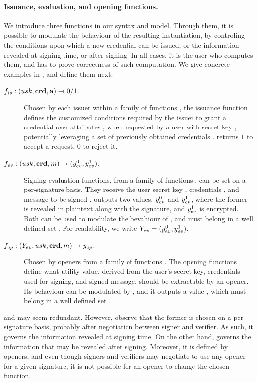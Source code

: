 \paragraph{Issuance, evaluation, and opening functions.} %
We introduce three functions in our syntax and model. Through them,
it is possible to modulate the behaviour of the resulting instantiation, by
controling the conditions upon which a new credential can be issued, or the
information revealed at signing time, or after signing. In all cases, it is
the user who computes them, and has to prove correctness of such computation.
We give concrete examples in , and define them next:

\begin{description}
\item[$f_{is}: (usk,\mathbf{crd},\mathbf{a})
  \rightarrow 0/1$.] Chosen by each issuer within a family of functions
  \famfissue, the issuance function defines the customized conditions required
  by the issuer to grant a credential over attributes \attrs, when requested by
  a user with secret key \usk, potentially leveraging a set of previously
  obtained credentials \scred. \fissue returns $1$ to accept a request, $0$ to
  reject it.
\item[$f_{ev}: (usk,\mathbf{crd},m)
  \rightarrow (y_{ev}^0,y_{ev}^1)$.] Signing evaluation functions, from a
  family of functions \famfeval, can be set on a per-signature basis. They
  receive the user secret key \usk, credentials \scred, and message to be signed
  \msg. \feval outputs two values, $y_{ev}^0$ and $y_{ev}^1$, where the former
  is revealed in plaintext along with the signature, and $y_{ev}^1$ is
  encrypted. Both can be used to modulate the bevahiour of \finsp, and must
  belong in a well defined set \rngfeval. For readability, we write $Y_{ev} =
  (y_{ev}^0,y_{ev}^1)$.
\item[$f_{op}: (Y_{ev},usk,\mathbf{crd},m) \rightarrow y_{op}$.]
  Chosen by openers from a family of functions \famfinsp. The opening
  functions define what utility value, derived from the user's secret key,
  credentials used for signing, and signed message, should be extractable by an
  opener. Its behaviour can be modulated by \Yeval, and it outputs a value
  \yinsp, which must belong in a well defined set \rngfinsp.
\end{description}

\feval and \finsp may seem redundant. However, observe that the former is chosen
on a per-signature basis, probably after negotiation between signer and
verifier. As such, it governs the information revealed at signing time. On the
other hand, \finsp governs the information that may be revealed after signing.
Moreover, it is defined by openers, and even though signers and verifiers
may negotiate to use any opener for a given signature, it is not possible for
an opener to change the chosen function.

